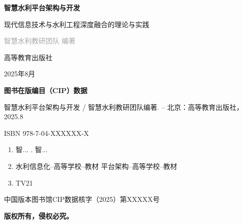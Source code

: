
\begin{titlepage}
\thispagestyle{empty}
\vspace*{2cm}

\begin{center}
\textcolor{primarycolor}{\Huge\bfseries 智慧水利平台架构与开发}

\vspace{1cm}

\textcolor{secondarycolor}{\Large 现代信息技术与水利工程深度融合的理论与实践}

\vspace{2cm}

\textcolor{darkgray}{\large 
智慧水利教研团队 \quad 编著
}

\vspace{3cm}

\textcolor{primarycolor}{\large 
高等教育出版社
}

\vfill

\textcolor{mediumgray}{\small 2025年8月}
\end{center}

\clearpage

\thispagestyle{empty}
\vspace*{5cm}

\noindent
\textbf{图书在版编目（CIP）数据}

\vspace{0.5cm}

智慧水利平台架构与开发 / 智慧水利教研团队编著. -- 北京：高等教育出版社，2025.8

ISBN 978-7-04-XXXXXX-X

\vspace{0.5cm}

\begin{enumerate}[label=\Roman*., leftmargin=1.5cm]
\item 智... \quad {}. 智...
\item 水利信息化--高等学校--教材 \quad 平台架构--高等学校--教材
\item TV21
\end{enumerate}

\vspace{0.5cm}

中国版本图书馆CIP数据核字（2025）第XXXXX号

\vspace{2cm}

\noindent
\textbf{版权所有，侵权必究。}


\end{titlepage}
